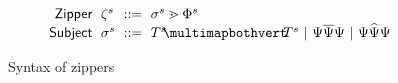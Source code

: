 \begin{figure}
  \vspace{-3px}
  \[
  \arraycolsep=3pt\begin{array}{rlrl}
      \mathsf{Zipper} & \zip^s & ::= & \zipper{\subject^s}{\tframe^s} \\
      \mathsf{Subject} & \subject^{s} & ::= &
        \pointing{\tiles^s}{\tiles^s} ~\vert~
        \selecting{\selection}{\selection}{\selection} ~\vert~
        \restructuring{\selection}{\selection}{\selection}
  \end{array}\]
  \caption{
    Syntax of zippers
  }
  \label{fig:zipper-syntax}
\end{figure}
